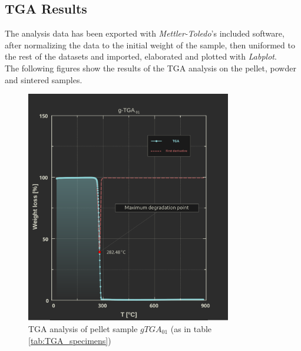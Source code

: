 \documentclass{article}
\begin{document}
        \subsection{TGA Results\label{TGA_Results}}
        The analysis data has been exported with \textit{Mettler-Toledo}'s included software, after normalizing the data to the initial weight of the sample,
        then uniformed to the rest of the datasets and imported, elaborated and plotted with \textit{Labplot}. \\
        The following figures show the results of the TGA analysis on the pellet, powder and sintered samples. \\ 
        \begin{figure}[ht]
            \centering
            \includegraphics[width=0.8\textwidth]{Pictures/Thermal_analysis_plots/TGA_catalogued/Fixed/g-TGA01.pdf}
            \caption{TGA analysis of pellet sample $gTGA_{01}$ (as in table \ref{tab:TGA_specimens})}
            \label{fig:TGA_01}
        \end{figure}
\end{document}
